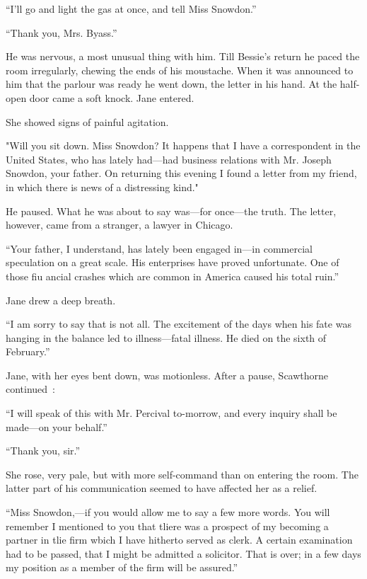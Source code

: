 ``I'll go and light the gas at once, and tell Miss Snowdon.''

``Thank you, Mrs. Byass.''

He was nervous, a most unusual thing with him. Till Bessie's return he
paced the room irregularly, chewing the ends of his moustache. When it
was announced to him that the parlour was ready he went down, the letter
in his hand. At the half-open door came a soft knock. Jane entered.

She showed signs of painful agitation.

"Will you sit down. Miss Snowdon? It happens that I have a correspondent
in the United States, who has lately had---had business relations with
Mr. Joseph Snowdon, your {\protect\hypertarget{305}{}{}} father. On
returning this evening I found a letter from my friend, in which there
is news of a distressing kind."

He paused. What he was about to say was---for once---the truth. The
letter, however, came from a stranger, a lawyer in Chicago.

``Your father, I understand, has lately been engaged in---in commercial
speculation on a great scale. His enterprises have proved unfortunate.
One of those fiu ancial crashes which are common in America caused his
total ruin.''

Jane drew a deep breath.

``I am sorry to say that is not all. The excitement of the days when his
fate was hanging in the balance led to illness---fatal illness. He died
on the sixth of February.''

Jane, with her eyes bent down, was motionless. After a pause, Scawthorne
continued~:

``I will speak of this with Mr. Percival to-morrow, and every inquiry
shall be made---on your behalf.''

``Thank you, sir.''

She rose, very pale, but with more self-command than on entering the
room. The latter part of his communication seemed to have affected her
as a relief.

{\protect\hypertarget{306}{}{}} ``Miss Snowdon,---if you would allow me
to say a few more words. You will remember I mentioned to you that
tliere was a prospect of my becoming a partner in tlie firm wbich I have
hitherto served as clerk. A certain examination had to be passed, that I
might be admitted a solicitor. That is over; in a few days my position
as a member of the firm will be assured.''

